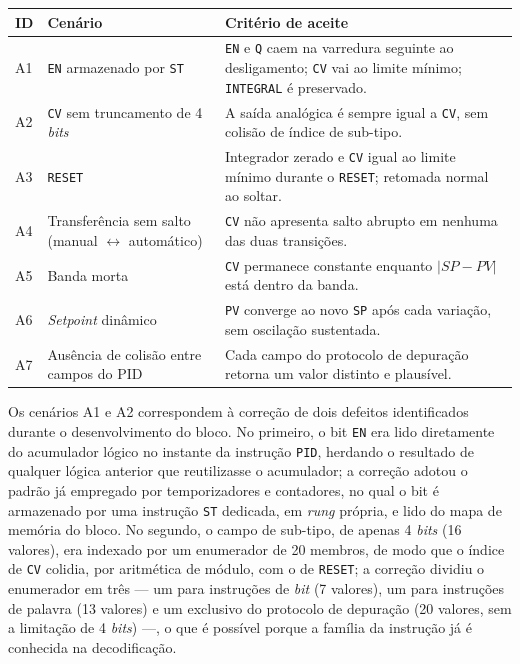 \begin{quadrofixo}
    \centering
    \begin{tabular}{|l|p{4.6cm}|p{7.6cm}|}
        \hline
        ID & Cenário & Critério de aceite \\
        \hline
        A1 & \texttt{EN} armazenado por \texttt{ST} & \texttt{EN} e \texttt{Q} caem na varredura seguinte ao desligamento; \texttt{CV} vai ao limite mínimo; \texttt{INTEGRAL} é preservado. \\
        \hline
        A2 & \texttt{CV} sem truncamento de 4 \textit{bits} & A saída analógica é sempre igual a \texttt{CV}, sem colisão de índice de sub-tipo. \\
        \hline
        A3 & \texttt{RESET} & Integrador zerado e \texttt{CV} igual ao limite mínimo durante o \texttt{RESET}; retomada normal ao soltar. \\
        \hline
        A4 & Transferência sem salto (manual $\leftrightarrow$ automático) & \texttt{CV} não apresenta salto abrupto em nenhuma das duas transições. \\
        \hline
        A5 & Banda morta & \texttt{CV} permanece constante enquanto $\lvert SP - PV \rvert$ está dentro da banda. \\
        \hline
        A6 & \textit{Setpoint} dinâmico & \texttt{PV} converge ao novo \texttt{SP} após cada variação, sem oscilação sustentada. \\
        \hline
        A7 & Ausência de colisão entre campos do PID & Cada campo do protocolo de depuração retorna um valor distinto e plausível. \\
        \hline
    \end{tabular}

    \label{qua:ape-unidade-pid}
\end{quadrofixo}

Os cenários A1 e A2 correspondem à correção de dois defeitos identificados durante o desenvolvimento do bloco.
No primeiro, o bit \texttt{EN} era lido diretamente do acumulador lógico no instante da instrução \texttt{PID}, herdando o resultado de qualquer lógica anterior que reutilizasse o acumulador; a correção adotou o padrão já empregado por temporizadores e contadores, no qual o bit é armazenado por uma instrução \texttt{ST} dedicada, em \textit{rung} própria, e lido do mapa de memória do bloco.
No segundo, o campo de sub-tipo, de apenas 4 \textit{bits} (16 valores), era indexado por um enumerador de 20 membros, de modo que o índice de \texttt{CV} colidia, por aritmética de módulo, com o de \texttt{RESET}; a correção dividiu o enumerador em três --- um para instruções de \textit{bit} (7 valores), um para instruções de palavra (13 valores) e um exclusivo do protocolo de depuração (20 valores, sem a limitação de 4 \textit{bits}) ---, o que é possível porque a família da instrução já é conhecida na decodificação.

